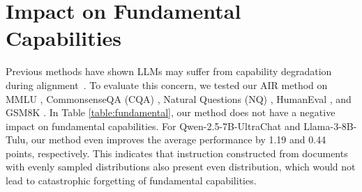 \clearpage
\appendix
\onecolumn


\section{Impact on Fundamental Capabilities}
\label{app: fundamental}

\begin{table}[h]
\centering
\renewcommand{\arraystretch}{1.0}
\caption{Experiment results on fundamental capabilities.}
\label{table:fundamental}
\end{table}


Previous methods have shown LLMs may suffer from capability degradation during alignment~\cite{ouyang2022training}. To evaluate this concern, we tested our AIR method on MMLU \cite{hendrycks2021measuring}, CommonsenseQA (CQA) \cite{talmor-etal-2019-commonsenseqa}, Natural Questions (NQ) \cite{kwiatkowski2019natural}, HumanEval \cite{chen2021evaluatinglargelanguagemodels}, and GSM8K \cite{cobbe2021trainingverifierssolvemath}. In Table \ref{table:fundamental}, our method does not have a negative impact on fundamental capabilities. For Qwen-2.5-7B-UltraChat and Llama-3-8B-Tulu, our method even improves the average performance by 1.19 and 0.44 points, respectively. This indicates that instruction constructed from documents with evenly sampled distributions also present even distribution, which would not lead to catastrophic forgetting of fundamental capabilities.





